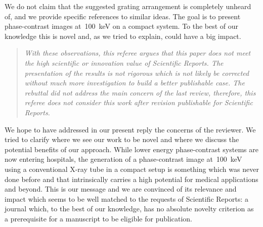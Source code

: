 \documentclass[a4paper,english]{scrartcl}
\newenvironment{reviewerquote}{\begin{quote}\itshape}{\end{quote}}
\begin{document}
We do not claim that the
suggested grating arrangement is completely unheard of, and we
provide specific references to similar ideas. The goal is to present
phase-contrast images at~\SI{100}{\kilo\eV}
on a compact system. To the best of our knowledge this is novel and, as
we tried to explain, could have a big impact.

\begin{reviewerquote}
With these observations, this referee argues that this paper
does not meet the high scientific or innovation value of Scientific Reports.
The presentation of the results is not rigorous which is not likely be
corrected without much more investigation to build a better publishable
case. The rebuttal did not address the main concern of the last review,
therefore, this referee does not consider this work after revision
publishable for Scientific Reports.
\end{reviewerquote}

We hope to have addressed in our present reply the
concerns of the reviewer. We tried to clarify where we see our work to be
novel and where we discuss the potential benefits of our approach. While
lower energy phase-contrast systems are now entering hospitals, the
generation of a phase-contrast image at~\SI{100}{\kilo\eV} using a conventional X-ray
tube in a compact setup is something which was never done before and that
intrinsically carries a high potential for medical applications and beyond.
This is our message and we are convinced of its relevance and impact which
seems to be well matched to the requests of Scientific Reports: a journal
which, to the best of our knowledge, has no absolute novelty criterion as a
prerequisite for a manuscript to be eligible for publication.



\end{document}
